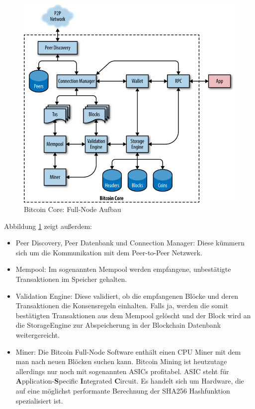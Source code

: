 \begin{figure}[H]
\centering
\includegraphics[width=1\linewidth]{Figures/btc_core_full_node_architecture}
\decoRule
\caption{Bitcoin Core: Full-Node Aufbau \cite{mastering_bitcoin}}
\label{fig:btc_core_full_node_architecture}
\end{figure}
\noindent Abbildung \ref{fig:btc_core_full_node_architecture} zeigt außerdem: 
\begin{itemize}
\item Peer Discovery, Peer Datenbank und Connection Manager: Diese kümmern sich um die Kommunikation mit dem Peer-to-Peer Netzwerk.
\item Mempool: Im sogenannten Mempool werden empfangene, unbestätigte Transaktionen im Speicher gehalten.
\item Validation Engine: Diese validiert, ob die empfangenen Blöcke und deren Transaktionen die Konsensregeln einhalten. Falls ja, werden die somit bestätigten Transaktionen aus dem Mempool gelöscht und der Block wird an die StorageEngine zur Abspeicherung in der Blockchain Datenbank weitergereicht.
\item Miner: Die Bitcoin Full-Node Software enthält einen CPU Miner mit dem man nach neuen Blöcken suchen kann. Bitcoin Mining ist heutzutage allerdings nur noch mit sogenannten ASICs profitabel. ASIC steht für \textbf{A}pplication-\textbf{S}pecific \textbf{I}ntegrated \textbf{C}ircuit. Es handelt sich um Hardware, die auf eine möglichst performante Berechnung der SHA256 Hashfunktion spezialisiert ist.
\end{itemize}


